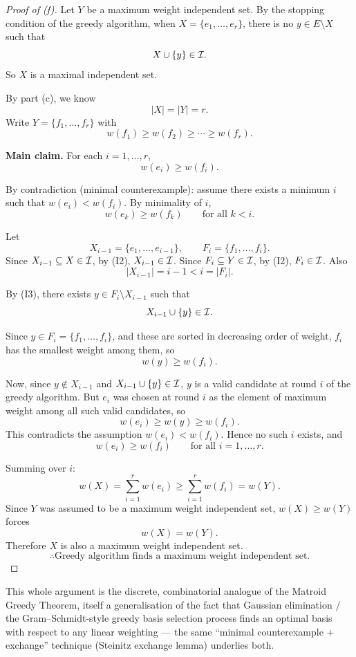 \documentclass[11pt]{article}
\begin{document}
\begin{solution}[(f)]
\begin{proof}[Proof of (f)]
    Let $Y$ be a maximum weight independent set. By the stopping
    condition of the greedy algorithm, when $X=\{e_1,\dots,e_r\}$,
    there is no $y\in E\setminus X$ such that
    \[
        X\cup\{y\}\in\mathcal{I}.
    \]
    So $X$ is a maximal independent set.

    By part (c), we know
    \[
        |X|=|Y|=r.
    \]
    Write $Y=\{f_1,\dots,f_r\}$ with
    \[
        w(f_1)\ge w(f_2) \ge \cdots \ge w(f_r).
    \]

    \medskip
    \textbf{Main claim.} For each $i=1,\dots,r$,
    \[
        w(e_i)\ge w(f_i).
    \]

    By contradiction (minimal counterexample): assume there exists a
    minimum $i$ such that $w(e_i) < w(f_i)$. By minimality of $i$,
    \[
        w(e_k)\ge w(f_k) \qquad \text{for all } k<i.
    \]

    Let
    \[
        X_{i-1}=\{e_1,\dots,e_{i-1}\}, \qquad F_i=\{f_1,\dots,f_i\}.
    \]
    Since $X_{i-1}\subseteq X\in\mathcal{I}$, by (I2), $X_{i-1}\in\mathcal{I}$. Since
    $F_i\subseteq Y\in\mathcal{I}$, by (I2), $F_i\in\mathcal{I}$. Also
    \[
        |X_{i-1}|=i-1 < i = |F_i|.
    \]

    By (I3), there exists $y\in F_i\setminus X_{i-1}$ such that
    \[
        X_{i-1}\cup\{y\}\in\mathcal{I}.
    \]

    Since $y\in F_i = \{f_1,\dots,f_i\}$, and these are sorted in
    decreasing order of weight, $f_i$ has the smallest weight among
    them, so
    \[
        w(y) \ge w(f_i).
    \]

    Now, since $y\notin X_{i-1}$ and $X_{i-1}\cup\{y\}\in\mathcal{I}$, $y$ is a
    valid candidate at round $i$ of the greedy algorithm. But $e_i$
    was chosen at round $i$ as the element of maximum weight among
    all such valid candidates, so
    \[
        w(e_i) \ge w(y) \ge w(f_i).
    \]
    This contradicts the assumption $w(e_i) < w(f_i)$. Hence no such
    $i$ exists, and
    \[
        w(e_i)\ge w(f_i) \qquad \text{for all } i=1,\dots,r.
    \]

    \medskip
    Summing over $i$:
    \[
        w(X) = \sum_{i=1}^r w(e_i) \ge \sum_{i=1}^r w(f_i) = w(Y).
    \]
    Since $Y$ was assumed to be a maximum weight independent set,
    $w(X)\ge w(Y)$ forces
    \[
        w(X)=w(Y).
    \]
    Therefore $X$ is also a maximum weight independent set.
    \[
        \therefore \text{Greedy algorithm finds a maximum weight
        independent set.}
    \]
\end{proof}

\begin{remark}
    This whole argument is the discrete, combinatorial analogue of
    the Matroid Greedy Theorem, itself a generalisation of the fact
    that Gaussian elimination / the Gram--Schmidt-style greedy basis
    selection process finds an optimal basis with respect to any
    linear weighting --- the same ``minimal counterexample +
    exchange'' technique (Steinitz exchange lemma) underlies both.
\end{remark}
\end{solution}
\end{document}
